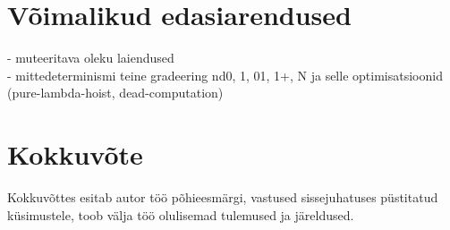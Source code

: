 \documentclass[a4paper,12pt]{article}
\begin{document}
\clearpage

\section{Võimalikud edasiarendused}

- muteeritava oleku laiendused\\
- mittedeterminismi teine gradeering nd0, 1, 01, 1+, N ja selle optimisatsioonid (pure-lambda-hoist, dead-computation)

\clearpage

\section{Kokkuvõte}
Kokkuvõttes esitab autor töö põhieesmärgi, vastused sissejuhatuses püstitatud
küsimustele, toob välja töö olulisemad tulemused ja järeldused.

\clearpage

\renewcommand{\baselinestretch}{1.15}
\small



\end{document}
